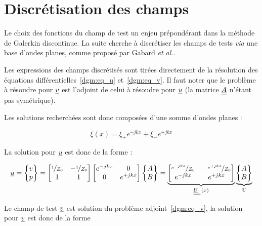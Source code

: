 \section{Discrétisation des champs}

Le choix des fonctions du champ de test un enjeu prépondérant dans la méthode de Galerkin discontinue.
La suite cherche à discrétiser les champs de tests \textit{via} une base d'ondes planes, comme proposé par Gabard
\textit{et al.}\cite{Gabard15}.

Les expressions des champs discrétisés sont tirées directement de la résolution des équations
différentielles~\eqref{dgm:eq_u} et~\eqref{dgm:eq_v}. Il faut noter que le problème à résoudre pour $\underline{v}$ est l'adjoint
de celui à résoudre pour $\underline{u}$ (la matrice $\underline{\underline{A}}$ n'étant pas symétrique).

Les solutions recherchées sont donc composées d'une somme d'ondes planes :

\[
    \xi(x) = \xi_+e^{-jkx}+\xi_-e^{+jkx}
\]

La solution pour $\underline{u}$ est donc de la forme :

\begin{equation}
    \underline{u} = \begin{Bmatrix}v\\p\end{Bmatrix} =
    \begin{bmatrix}
        \nicefrac{1}{Z_0} & -\nicefrac{1}{Z_0}\\
        1 & 1
    \end{bmatrix}
    \begin{bmatrix}
        e^{-jkx} & 0\\
        0 & e^{+jkx}
    \end{bmatrix}
    \begin{Bmatrix}
        A\\B
    \end{Bmatrix}
    =
    \underbrace{\begin{bmatrix}
        \nicefrac{e^{-jkx}}{Z_0} & -\nicefrac{e^{+jkx}}{Z_0}\\
        e^{-jkx} & e^{+jkx}
    \end{bmatrix}}_{\underline{\underline{U}}_u(x)}
    \underbrace{\begin{Bmatrix}
        A\\B
    \end{Bmatrix}}_{\mathbb{U}}
\end{equation}

Le champ de test $\underline{v}$ est solution du problème adjoint~\eqref{dgm:eq_v}, la solution pour $\underline{v}$ est donc de la forme

